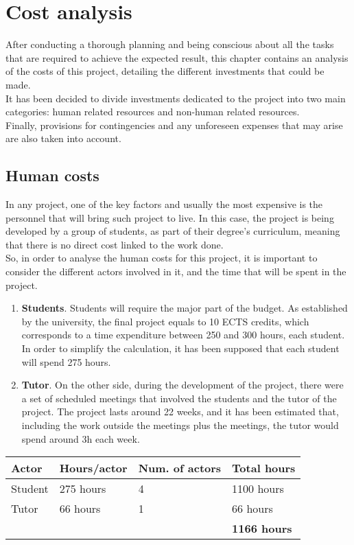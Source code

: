 \documentclass[../memory.tex]{subfiles}
\begin{document}
\chapter{Cost analysis}
After conducting a thorough planning and being conscious about all the tasks
that are required to achieve the expected result, this chapter contains an
analysis of the costs of this project, detailing the different investments that
could be made.
\\[8pt]
It has been decided to divide investments dedicated to the project into two main
categories: human related resources and non-human related resources.
\\[8pt]
Finally, provisions for contingencies and any unforeseen expenses that may arise
are also taken into account.
\section{Human costs}
In any project, one of the key factors and usually the most expensive is the
personnel that will bring such project to live. In this case, the project is
being developed by a group of students, as part of their degree's curriculum,
meaning that there is no direct cost linked to the work done.
\\[8pt]
So, in order to analyse the human costs for this project, it is important to
consider the different actors involved in it, and the time that will be spent in
the project.
\begin{enumerate}
	\item\textbf{Students}. Students will require the major part of the budget. As
	established by the university, the final project equals to 10 ECTS credits,
	which corresponds to a time expenditure between 250 and 300 hours, each
	student. In order to simplify the calculation, it has been supposed that
	each student will spend 275 hours.
	\item\textbf{Tutor}. On the other side, during the development of the project,
	there were a set of scheduled meetings that involved the students and the
	tutor of the project. The project lasts around 22 weeks, and it has been
	estimated that, including the work outside the meetings plus the meetings,
	the tutor would spend around 3h each week.
\end{enumerate}
\vspace*{8pt}
\begin{tabularx}{\textwidth}{|X|X|X|X|}
	\hline
	\rowcolor{rowColor}
	Actor                 & Hours/actor         & Num. of actors & Total hours \\
	\hline
	Student               & 275 hours           & 4              & 1100 hours  \\
	\hline
	Tutor                 & 66 hours            & 1              & 66 hours    \\
	\hline
	\multicolumn{3}{X|}{} & \textbf{1166 hours}                                \\
	\cline{4-3}
\end{tabularx}
\end{document}

